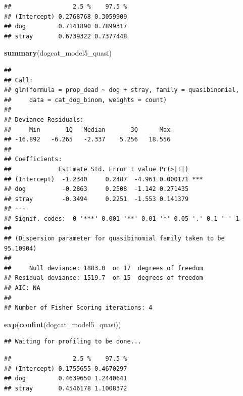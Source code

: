 \documentclass[]{article}
\newenvironment{Shaded}{\begin{snugshade}}{\end{snugshade}}
\newcommand{\KeywordTok}[1]{\textcolor[rgb]{0.13,0.29,0.53}{\textbf{#1}}}
\newcommand{\NormalTok}[1]{#1}
\begin{document}
\begin{verbatim}
##                 2.5 %    97.5 %
## (Intercept) 0.2768768 0.3059909
## dog         0.7141890 0.7899317
## stray       0.6739322 0.7377448
\end{verbatim}

\begin{Shaded}
\begin{Highlighting}[]
\KeywordTok{summary}\NormalTok{(dogcat_model5_quasi)}
\end{Highlighting}
\end{Shaded}

\begin{verbatim}
## 
## Call:
## glm(formula = prop_dead ~ dog + stray, family = quasibinomial, 
##     data = cat_dog_binom, weights = count)
## 
## Deviance Residuals: 
##     Min       1Q   Median       3Q      Max  
## -16.892   -6.265   -2.337    5.256   18.556  
## 
## Coefficients:
##             Estimate Std. Error t value Pr(>|t|)    
## (Intercept)  -1.2340     0.2487  -4.961 0.000171 ***
## dog          -0.2863     0.2508  -1.142 0.271435    
## stray        -0.3494     0.2251  -1.553 0.141379    
## ---
## Signif. codes:  0 '***' 0.001 '**' 0.01 '*' 0.05 '.' 0.1 ' ' 1
## 
## (Dispersion parameter for quasibinomial family taken to be 95.10904)
## 
##     Null deviance: 1883.0  on 17  degrees of freedom
## Residual deviance: 1519.7  on 15  degrees of freedom
## AIC: NA
## 
## Number of Fisher Scoring iterations: 4
\end{verbatim}

\begin{Shaded}
\begin{Highlighting}[]
\KeywordTok{exp}\NormalTok{(}\KeywordTok{confint}\NormalTok{(dogcat_model5_quasi))}
\end{Highlighting}
\end{Shaded}

\begin{verbatim}
## Waiting for profiling to be done...
\end{verbatim}

\begin{verbatim}
##                 2.5 %    97.5 %
## (Intercept) 0.1755655 0.4670297
## dog         0.4639650 1.2440641
## stray       0.4546178 1.1008372
\end{verbatim}
\end{document}
